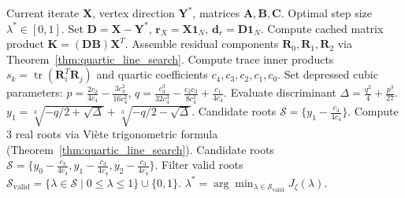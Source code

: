 \documentclass[a4paper,fleqn]{cas-dc}
\theoremstyle{thmstyleone}
\theoremstyle{thmstyletwo}
\theoremstyle{thmstylethree}
\begin{document}
\begin{algorithm}[!t]
\caption{Exact Closed-Form Cardano Line Search}
\label{alg:cardano_linesearch}
\begin{algorithmic}[1]\small
\REQUIRE Current iterate $\mathbf{X}$, vertex direction $\mathbf{Y}^*$, matrices $\mathbf{A}, \mathbf{B}, \mathbf{C}$.
\ENSURE Optimal step size $\lambda^* \in [0, 1]$.
\STATE Set $\mathbf{D} = \mathbf{X} - \mathbf{Y}^*$, $\mathbf{r}_X = \mathbf{X}\mathbf{1}_N$, $\mathbf{d}_r = \mathbf{D}\mathbf{1}_N$.
\STATE Compute cached matrix product $\mathbf{K} = (\mathbf{D}\mathbf{B})\mathbf{X}^T$.
\STATE Assemble residual components $\mathbf{R}_0, \mathbf{R}_1, \mathbf{R}_2$ via Theorem~\ref{thm:quartic_line_search}.
\STATE Compute trace inner products $s_k = \operatorname{tr}(\mathbf{R}_i^T \mathbf{R}_j)$ and quartic coefficients $c_4, c_3, c_2, c_1, c_0$.
\STATE Set depressed cubic parameters: $p = \frac{2 c_2}{4 c_4} - \frac{3 c_3^2}{16 c_4^2}$, $q = \frac{c_3^3}{32 c_4^3} - \frac{c_2 c_3}{8 c_4^2} + \frac{c_1}{4 c_4}$.
\STATE Evaluate discriminant $\Delta = \frac{q^2}{4} + \frac{p^3}{27}$.
    \STATE $y_1 = \sqrt[3]{-q/2 + \sqrt{\Delta}} + \sqrt[3]{-q/2 - \sqrt{\Delta}}$.
    \STATE Candidate roots $\mathcal{S} = \{ y_1 - \frac{c_3}{4 c_4} \}$.
\ELSE
    \STATE Compute 3 real roots via Vi\`ete trigonometric formula (Theorem~\ref{thm:quartic_line_search}).
    \STATE Candidate roots $\mathcal{S} = \{ y_0 - \frac{c_3}{4 c_4}, y_1 - \frac{c_3}{4 c_4}, y_2 - \frac{c_3}{4 c_4} \}$.
\ENDIF
\STATE Filter valid roots $\mathcal{S}_{\text{valid}} = \{ \lambda \in \mathcal{S} \mid 0 \le \lambda \le 1 \} \cup \{0, 1\}$.
\RETURN $\lambda^* = \arg\min_{\lambda \in \mathcal{S}_{\text{valid}}} J_\zeta(\lambda)$.
\end{algorithmic}
\end{algorithm}
\end{document}
